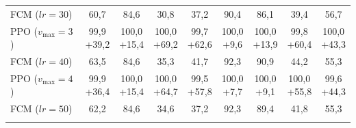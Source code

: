 \begin{table}[H]
\begin{tabular}{l c c c c c c c c}
\midrule
FCM ($lr{=}30$) & 60{,}7 & 84{,}6 & 30{,}8 & 37{,}2 & 90{,}4 & 86{,}1 & 39{,}4 & 56{,}7 \\
\rowcolor{rowalt}
PPO ($v_{\max}{=}3$) & \shortstack{99{,}9\\[-1pt]{\scriptsize\textcolor{green!50!black}{+39{,}2}}} & \shortstack{100{,}0\\[-1pt]{\scriptsize\textcolor{green!50!black}{+15{,}4}}} & \shortstack{100{,}0\\[-1pt]{\scriptsize\textcolor{green!50!black}{+69{,}2}}} & \shortstack{99{,}7\\[-1pt]{\scriptsize\textcolor{green!50!black}{+62{,}6}}} & \shortstack{100{,}0\\[-1pt]{\scriptsize\textcolor{green!50!black}{+9{,}6}}} & \shortstack{100{,}0\\[-1pt]{\scriptsize\textcolor{green!50!black}{+13{,}9}}} & \shortstack{99{,}8\\[-1pt]{\scriptsize\textcolor{green!50!black}{+60{,}4}}} & \shortstack{100{,}0\\[-1pt]{\scriptsize\textcolor{green!50!black}{+43{,}3}}} \\
\midrule
FCM ($lr{=}40$) & 63{,}5 & 84{,}6 & 35{,}3 & 41{,}7 & 92{,}3 & 90{,}9 & 44{,}2 & 55{,}3 \\
\rowcolor{rowalt}
PPO ($v_{\max}{=}4$) & \shortstack{99{,}9\\[-1pt]{\scriptsize\textcolor{green!50!black}{+36{,}4}}} & \shortstack{100{,}0\\[-1pt]{\scriptsize\textcolor{green!50!black}{+15{,}4}}} & \shortstack{100{,}0\\[-1pt]{\scriptsize\textcolor{green!50!black}{+64{,}7}}} & \shortstack{99{,}5\\[-1pt]{\scriptsize\textcolor{green!50!black}{+57{,}8}}} & \shortstack{100{,}0\\[-1pt]{\scriptsize\textcolor{green!50!black}{+7{,}7}}} & \shortstack{100{,}0\\[-1pt]{\scriptsize\textcolor{green!50!black}{+9{,}1}}} & \shortstack{100{,}0\\[-1pt]{\scriptsize\textcolor{green!50!black}{+55{,}8}}} & \shortstack{99{,}6\\[-1pt]{\scriptsize\textcolor{green!50!black}{+44{,}3}}} \\
\midrule
FCM ($lr{=}50$) & 62{,}2 & 84{,}6 & 34{,}6 & 37{,}2 & 92{,}3 & 89{,}4 & 41{,}8 & 55{,}3 \\
\rowcolor{rowalt}

\end{tabular}
\end{table}
